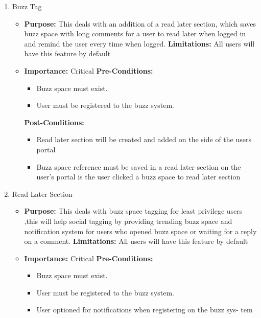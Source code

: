 \documentclass[11pt]{article}
\begin{document}
\begin{enumerate}
\item Buzz Tag
\begin{itemize}
\item \textbf{Purpose:}
This deals with an addition of a read later section, which saves
buzz space with long comments for a user to read later when logged
in and remind the user every time when logged.
\newline
\textbf{Limitations:} 
All users will have this feature by default

\item \textbf{Importance:} Critical\newline
\textbf{Pre-Conditions: }
	\begin{itemize}
	\item Buzz space must exist.
	\item User must be registered to the buzz system.

	\end{itemize}

\textbf{Post-Conditions: }
	\begin{itemize}
	\item Read later section will be created and added on the side of the
users portal
	\item Buzz space reference must be saved in a read later section on the
user’s portal is the user clicked a buzz space to read later section
	
	\end{itemize}
\end{itemize}

\item Read Later Section
\begin{itemize}
\item \textbf{Purpose:}
This deals with buzz space tagging for least privilege users
,this will help social tagging by providing trending buzz space and
notification system for users who opened buzz space or waiting for a
reply on a comment.
\newline
\textbf{Limitations:} 
All users will have this feature by default

\item \textbf{Importance:} Critical\newline
\textbf{Pre-Conditions: }
	\begin{itemize}
	\item Buzz space must exist.
	\item User must be registered to the buzz system.
	\item User optioned for notifications when registering on the buzz sys-
tem


\end{itemize}
\end{itemize}
\end{enumerate}
\end{document}
